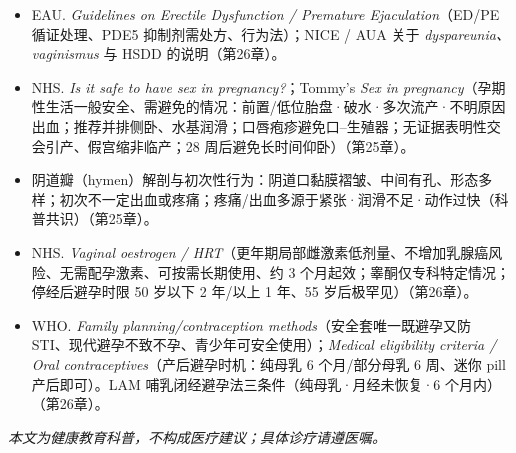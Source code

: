\documentclass[12pt,UTF8,openany]{ctexbook}
\begin{document}
\begin{itemize}[leftmargin=2em]
  \item EAU. \emph{Guidelines on Erectile Dysfunction / Premature Ejaculation}（ED/PE 循证处理、PDE5 抑制剂需处方、行为法）；NICE / AUA 关于 \emph{dyspareunia、vaginismus} 与 HSDD 的说明（第26章）。
  \item NHS. \emph{Is it safe to have sex in pregnancy?}；Tommy's \emph{Sex in pregnancy}（孕期性生活一般安全、需避免的情况：前置/低位胎盘·破水·多次流产·不明原因出血；推荐并排侧卧、水基润滑；口唇疱疹避免口--生殖器；无证据表明性交会引产、假宫缩非临产；28 周后避免长时间仰卧）（第25章）。
  \item 阴道瓣（hymen）解剖与初次性行为：阴道口黏膜褶皱、中间有孔、形态多样；初次不一定出血或疼痛；疼痛/出血多源于紧张·润滑不足·动作过快（科普共识）（第25章）。
  \item NHS. \emph{Vaginal oestrogen / HRT}（更年期局部雌激素低剂量、不增加乳腺癌风险、无需配孕激素、可按需长期使用、约 3 个月起效；睾酮仅专科特定情况；停经后避孕时限 50 岁以下 2 年/以上 1 年、55 岁后极罕见）（第26章）。
  \item WHO. \emph{Family planning/contraception methods}（安全套唯一既避孕又防 STI、现代避孕不致不孕、青少年可安全使用）；\emph{Medical eligibility criteria / Oral contraceptives}（产后避孕时机：纯母乳 6 个月/部分母乳 6 周、迷你 pill 产后即可）。LAM 哺乳闭经避孕法三条件（纯母乳·月经未恢复·6 个月内）（第26章）。
\end{itemize}

\begin{center}
\itshape 本文为健康教育科普，不构成医疗建议；具体诊疗请遵医嘱。
\end{center}
\end{document}
